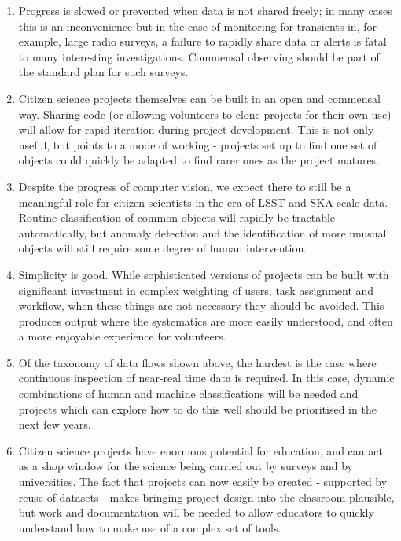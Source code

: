\documentclass{pasa}
\begin{document}
\begin{enumerate} 

\item Progress is slowed or prevented when data is not shared freely; in many cases this is an inconvenience but in the case of monitoring for transients in, for example, large radio surveys, a failure to rapidly share data or alerts is fatal to many interesting investigations. Commensal observing should be part of the standard plan for such surveys.

\item Citizen science projects themselves can be built in an open and commensal way. Sharing code (or allowing volunteers to clone projects for their own use) will allow for rapid iteration during project development. This is not only useful, but points to a mode of working - projects set up to find one set of objects could quickly be adapted to find rarer ones as the project matures. 

\item Despite the progress of computer vision, we expect there to still be a meaningful role for citizen scientists in the era of LSST and SKA-scale data. Routine classification of common objects will rapidly be tractable automatically, but anomaly detection and the identification of more unusual objects will still require some degree of human intervention. 

\item Simplicity is good. While sophisticated versions of projects can be built with significant investment in complex weighting of users, task assignment and workflow, when these things are not necessary they should be avoided. This produces output where the systematics are more easily understood, and often a more enjoyable experience for volunteers. 

\item Of the taxonomy of data flows shown above, the hardest is the case where continuous inspection of near-real time data is required. In this case, dynamic combinations of human and machine classifications will be needed and projects which can explore how to do this well should be prioritised in the next few years.

\item Citizen science projects have enormous potential for education, and can act as a shop window for the science being carried out by surveys and by universities. The fact that projects can now easily be created - supported by reuse of datasets - makes bringing project design into the classroom plausible, but work and documentation will be needed to allow educators to quickly understand how to make use of a complex set of tools. 

\end{enumerate} 
\end{document}

